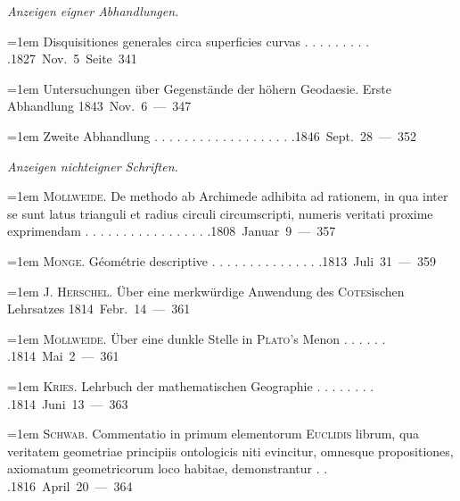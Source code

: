 \par{}%
\begingroup\fontsize{10.5}{13}\selectfont{}
\par\medskip{}
\noindent\textit{Anzeigen eigner Abhandlungen.}\par
\par\noindent\hangindent=1em Disquisitiones generales circa superficies curvas . . . . . . . . . .\hfill{}\hbox{}\nobreak\hfill\mbox{1827 Nov. 5 Seite 341}\par
\par\noindent\hangindent=1em Untersuchungen über Gegenstände der höhern Geodaesie. Erste Abhandlung \hfill{}\hbox{}\nobreak\hfill\mbox{1843 Nov. 6 — 347}\par
\par\noindent\hangindent=1em Zweite Abhandlung . . . . . . . . . . . . . . . . . . .\hfill{}\hbox{}\nobreak\hfill\mbox{1846 Sept. 28 — 352}\par
\par\medskip{}
\noindent\textit{Anzeigen nichteigner Schriften.}\par
\par\noindent\hangindent=1em \textsc{Mollweide}. De methodo ab Archimede adhibita ad rationem, in qua inter se sunt latus trianguli et radius circuli circumscripti, numeris veritati proxime exprimendam . . . . . . . . . . . . . . . . .\hfill{}\hbox{}\nobreak\hfill\mbox{1808 Januar 9 — 357}\par
\par\noindent\hangindent=1em \textsc{Monge}. Géométrie descriptive . . . . . . . . . . . . . . .\hfill{}\hbox{}\nobreak\hfill\mbox{1813 Juli 31 — 359}\par
\par\noindent\hangindent=1em J. \textsc{Herschel}. Über eine merkwürdige Anwendung des \textsc{Cotes}ischen Lehrsatzes \hfill{}\hbox{}\nobreak\hfill\mbox{1814 Febr. 14 — 361}\par
\par\noindent\hangindent=1em \textsc{Mollweide}. Über eine dunkle Stelle in \textsc{Plato}’s Menon . . . . . . .\hfill{}\hbox{}\nobreak\hfill\mbox{1814 Mai 2 — 361}\par
\par\noindent\hangindent=1em \textsc{Kries}. Lehrbuch der mathematischen Geographie . . . . . . . . .\hfill{}\hbox{}\nobreak\hfill\mbox{1814 Juni 13 — 363}\par
\par\noindent\hangindent=1em \textsc{Schwab}. Commentatio in primum elementorum \textsc{Euclidis} librum, qua veritatem geometriae principiis ontologicis niti evincitur, omnesque propositiones, axiomatum geometricorum loco habitae, demonstrantur . . .\hfill{}\hbox{}\nobreak\hfill\mbox{1816 April 20 — 364}\par
